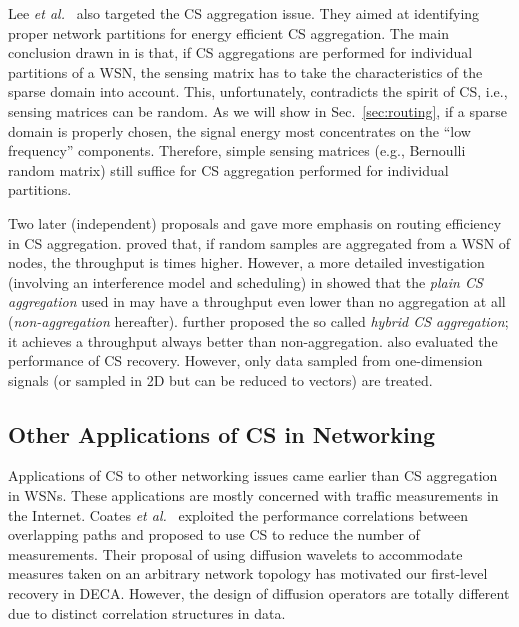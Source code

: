 \documentclass[conference]{IEEEtran}
\begin{document}
    Lee \textit{et al.}\ \cite{LeePSKO-GSN09} also targeted the CS aggregation issue. They aimed at identifying proper network partitions for energy efficient CS aggregation. The main conclusion drawn in \cite{LeePSKO-GSN09} is that, if CS aggregations are performed for individual partitions of a WSN, the sensing matrix has to take the characteristics of the sparse domain into account. This, unfortunately, contradicts the spirit of CS, i.e., sensing matrices can be random. As we will show in Sec.~\ref{sec:routing}, if a sparse domain is properly chosen, the signal energy most concentrates on the ``low frequency'' components. Therefore, simple sensing matrices (e.g., Bernoulli random matrix) still suffice for CS aggregation performed for individual partitions.

    Two later (independent) proposals \cite{LuoWSC-MobiCom09} and \cite{LuoXR-ICC10} gave more emphasis on routing efficiency in CS aggregation. \cite{LuoWSC-MobiCom09} proved that, if  random samples are aggregated from a WSN of  nodes, the throughput is  times higher. However, a more detailed investigation (involving an interference model and scheduling) in \cite{LuoXR-ICC10} showed that the \textit{plain CS aggregation} used in \cite{LuoWSC-MobiCom09} may have a throughput even lower than no aggregation at all (\textit{non-aggregation} hereafter). \cite{LuoXR-ICC10} further proposed the so called \textit{hybrid CS aggregation}; it achieves a throughput always better than non-aggregation. \cite{LuoWSC-MobiCom09} also evaluated the performance of CS recovery. However, only data sampled from one-dimension signals (or sampled in 2D but can be reduced to vectors) are treated.

  \subsection{Other Applications of CS in Networking}
Applications of CS to other networking issues came earlier than CS aggregation in WSNs. These applications are mostly concerned with traffic measurements in the Internet. Coates \textit{et al.}\ \cite{CoatesPR-IMC07} exploited the performance correlations between overlapping paths and proposed to use CS to reduce the number of measurements. Their proposal of using diffusion wavelets to accommodate measures taken on an arbitrary network topology has motivated our first-level recovery in DECA. However, the design of diffusion operators are totally different due to distinct correlation structures in data.
\end{document}
